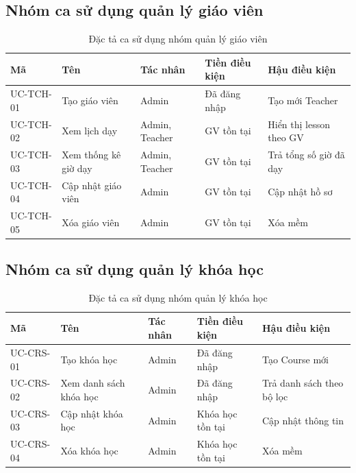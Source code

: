 \documentclass[../DoAn.tex]{subfiles}
\begin{document}
\subsection{Nhóm ca sử dụng quản lý giáo viên}

\begin{table}[H]
\centering
\caption{Đặc tả ca sử dụng nhóm quản lý giáo viên}
\label{table:bang2.5}
\begin{tabular}{|l|p{3cm}|l|p{2.5cm}|p{3cm}|}
\hline
\textbf{Mã} & \textbf{Tên} & \textbf{Tác nhân} & \textbf{Tiền điều kiện} & \textbf{Hậu điều kiện} \\ \hline
UC-TCH-01 & Tạo giáo viên & Admin & Đã đăng nhập & Tạo mới Teacher \\ \hline
UC-TCH-02 & Xem lịch dạy & Admin, Teacher & GV tồn tại & Hiển thị lesson theo GV \\ \hline
UC-TCH-03 & Xem thống kê giờ dạy & Admin, Teacher & GV tồn tại & Trả tổng số giờ đã dạy \\ \hline
UC-TCH-04 & Cập nhật giáo viên & Admin & GV tồn tại & Cập nhật hồ sơ \\ \hline
UC-TCH-05 & Xóa giáo viên & Admin & GV tồn tại & Xóa mềm \\ \hline
\end{tabular}
\end{table}

\subsection{Nhóm ca sử dụng quản lý khóa học}

\begin{table}[H]
\centering
\caption{Đặc tả ca sử dụng nhóm quản lý khóa học}
\label{table:bang2.6}
\begin{tabular}{|l|p{3cm}|l|p{2.5cm}|p{3cm}|}
\hline
\textbf{Mã} & \textbf{Tên} & \textbf{Tác nhân} & \textbf{Tiền điều kiện} & \textbf{Hậu điều kiện} \\ \hline
UC-CRS-01 & Tạo khóa học & Admin & Đã đăng nhập & Tạo Course mới \\ \hline
UC-CRS-02 & Xem danh sách khóa học & Admin & Đã đăng nhập & Trả danh sách theo bộ lọc \\ \hline
UC-CRS-03 & Cập nhật khóa học & Admin & Khóa học tồn tại & Cập nhật thông tin \\ \hline
UC-CRS-04 & Xóa khóa học & Admin & Khóa học tồn tại & Xóa mềm \\ \hline
\end{tabular}
\end{table}
\end{document}
